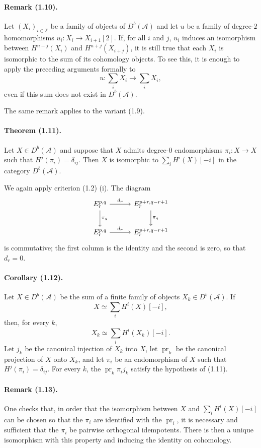 \documentclass[10pt]{article}
\newcommand{\Acal}{\mathcal A}
\newcommand{\Z}{\mathbb Z}
\newcommand{\Db}{D^b}
\newcommand{\pr}{\operatorname{pr}}
\begin{document}
\paragraph{Remark (1.10).} Let $(X_i)_{i\in\Z}$ be a family of objects of $\Db(\Acal)$ and let $u$ be a family of degree-$2$ homomorphisms $u_i:X_i\to X_{i+1}[2]$. If, for all $i$ and $j$, $u_i$ induces an isomorphism between $H^{n-j}(X_i)$ and $H^{n+j}(X_{i+j})$, it is still true that each $X_i$ is isomorphic to the sum of its cohomology objects. To see this, it is enough to apply the preceding arguments formally to
\[
u:\sum_iX_i\longrightarrow\sum_iX_i,
\]
even if this sum does not exist in $\Db(\Acal)$.

The same remark applies to the variant (1.9).

\paragraph{Theorem (1.11).} Let $X\in\Db(\Acal)$ and suppose that $X$ admits degree-$0$ endomorphisms $\pi_i:X\to X$ such that $H^j(\pi_i)=\delta_{ij}$. Then $X$ is isomorphic to $\sum_iH^i(X)[-i]$ in the category $\Db(\Acal)$.

We again apply criterion (1.2) (i). The diagram
\[
\begin{tikzcd}[column sep=3.0em,row sep=2.2em]
E_r^{p,q} \arrow[r,"d_r"] \arrow[d,"\pi_q"] & E_r^{p+r,q-r+1} \arrow[d,"\pi_q"]\\
E_r^{p,q} \arrow[r,"d_r"] & E_r^{p+r,q-r+1}
\end{tikzcd}
\]
is commutative; the first column is the identity and the second is zero, so that $d_r=0$.

\paragraph{Corollary (1.12).} Let $X\in\Db(\Acal)$ be the sum of a finite family of objects $X_k\in\Db(\Acal)$. If
\[
X\simeq\sum_iH^i(X)[-i],
\]
then, for every $k$,
\[
X_k\simeq\sum_iH^i(X_k)[-i].
\]
Let $j_k$ be the canonical injection of $X_k$ into $X$, let $\pr_k$ be the canonical projection of $X$ onto $X_k$, and let $\pi_i$ be an endomorphism of $X$ such that $H^j(\pi_i)=\delta_{ij}$. For every $k$, the $\pr_k\pi_i j_k$ satisfy the hypothesis of (1.11).

\paragraph{Remark (1.13).} One checks that, in order that the isomorphism between $X$ and $\sum_iH^i(X)[-i]$ can be chosen so that the $\pi_i$ are identified with the $\pr_i$, it is necessary and sufficient that the $\pi_i$ be pairwise orthogonal idempotents. There is then a unique isomorphism with this property and inducing the identity on cohomology.
\end{document}
